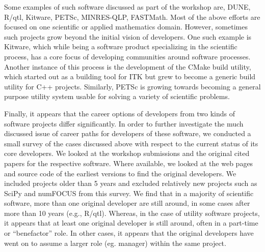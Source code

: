 \documentclass[11pt, oneside]{amsart}
\newcommand{\toolname}[1] {\textsf{#1}}
\begin{document}
Some examples of such software discussed as part of the workshop are,
\toolname{DUNE}, \toolname{R/qtl}, \toolname{Kitware},
\toolname{PETSc}, \toolname{MINRES-QLP}, \toolname{FASTMath}.  Most of
the above efforts are focused on one scientific or applied
mathematics domain. However, sometimes such projects grow beyond the
initial vision of developers. One such example is \toolname{Kitware},
which while being a software product specializing in the scientific
process, has a core focus of developing communities around software
processes. Another instance of this process is the development of the
\toolname{CMake} build utility, which started out as a building tool
for \toolname{ITK} but grew to become a generic build utility for C++
projects. Similarly, \toolname{PETSc} is growing towards becoming a
general purpose utility system usable for solving a variety of
scientific problems.

Finally, it appears that the career options of developers from
two kinds of software projects differ significantly. In order to
further investigate the much discussed issue of career paths for
developers of these software, we conducted a small survey of the cases
discussed above with respect to the current status of its core developers. We
looked at the workshop submissions and the original cited papers for the
respective software. Where available, we looked at the web pages and source
code of the earliest versions to find the original developers. We included
projects older than 5 years and excluded relatively new projects such as
\toolname{SciPy} and \toolname{numFOCUS} from this survey. We find that in a
majority of scientific software, more than one original developer are still
around, in some cases after more than 10 years (e.g., \toolname{R/qtl}).
Whereas, in the case of utility software projects, it appears that at least one
original developer is still around, often in a part-time or ``benefactor''
role. In other cases, it appears that the original developers have went on to
assume a larger role (eg. manager) within the same project.
\end{document}
